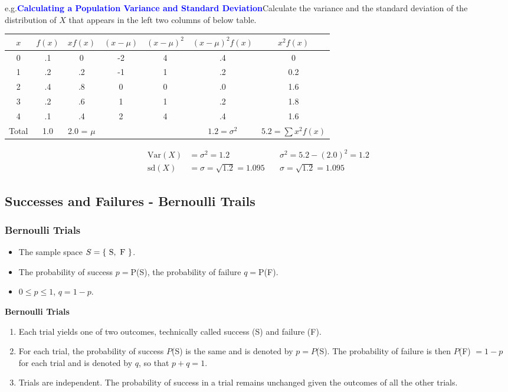 \documentclass[12pt,openany]{book}
\theoremstyle{definition}
\newcommand{\eg}{\textnormal{e.g.}}
\newcommand{\Var}{\text{Var}}
\newcommand{\sd}{\text{sd}}
\begin{document}
	\eg\textcolor{blue}{\bf Calculating a Population Variance and Standard Deviation}\quad Calculate the variance and the standard deviation of the distribution of $X$ that appears in the left two columns of below table.
	\begin{center}\begin{tabular}{c|c||cccc||c}
			\toprule[1.2pt]
			$x$ & $f(x)$ & $xf(x)$ & $(x-\mu)$ & $(x-\mu)^2$ & $(x-\mu)^2f(x)$ & $x^2f(x)$\\
			\hline
			0&.1& 0 & -2&4&.4&0\\
			1&.2& .2& -1&1&.2&0.2\\
			2&.4& .8& 0&0&.0&1.6\\
			3&.2& .6& 1&1&.2&1.8\\
			4&.1& .4& 2&4&.4&1.6\\
			\hline
			Total&1.0&2.0 = $\mu$&&&$1.2=\sigma^2$&$5.2=\sum x^2f(x)$\\
		\end{tabular}
	\end{center}\begin{align*}
	\Var(X)&=\sigma^2=1.2\quad& \sigma^2=5.2-(2.0)^2=1.2 \\
	\sd(X)&=\sigma=\sqrt{1.2}=1.095\quad& \sigma=\sqrt{1.2}=1.095
	\end{align*}
	
	\subsection{Successes and Failures - Bernoulli Trails}
	
	\subsubsection{Bernoulli Trials}
	\begin{itemize}
		\item The sample space $S = \set{\ \text{S},\ \text{F}\ }$.
		\item The probability of success $p=$P(S), the probability of failure $q=$P(F).
		\item $0\leq p\leq 1$, $q=1-p$.
	\end{itemize}
	\begin{tcolorbox}[colback=white]
		\centering
		\textbf{Bernoulli Trials} \begin{enumerate}
			\item Each trial yields one of two outcomes, technically called success (S) and failure (F).
			\item For each trial, the probability of success $P$(S) is the same and is denoted by $p = P$(S). The probability of failure is then $P$(F) $= 1-p$ for each trial and is denoted by $q$, so that $p+q=1$.
			\item Trials are independent. The probability of success in a trial remains unchanged given the outcomes of all the other trials.	
		\end{enumerate}
	\end{tcolorbox}
	
\end{document}
